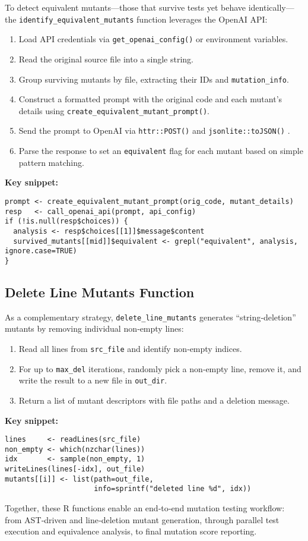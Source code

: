 To detect equivalent mutants—those that survive tests yet behave identically—the \texttt{identify\_equivalent\_mutants} function leverages the OpenAI API:

\begin{enumerate}
  \item Load API credentials via \texttt{get\_openai\_config()} or environment variables.  
  \item Read the original source file into a single string.  
  \item Group surviving mutants by file, extracting their IDs and \texttt{mutation\_info}.  
  \item Construct a formatted prompt with the original code and each mutant’s details using \texttt{create\_equivalent\_mutant\_prompt()}.  
  \item Send the prompt to OpenAI via \texttt{httr::POST()} and \texttt{jsonlite::toJSON()} \cite{wickham2011httr,ooms2014jsonlite,openai2023api}.  
  \item Parse the response to set an \texttt{equivalent} flag for each mutant based on simple pattern matching.
\end{enumerate}

\medskip
\noindent\textbf{Key snippet:}
\begin{verbatim}
prompt <- create_equivalent_mutant_prompt(orig_code, mutant_details)
resp   <- call_openai_api(prompt, api_config)
if (!is.null(resp$choices)) {
  analysis <- resp$choices[[1]]$message$content
  survived_mutants[[mid]]$equivalent <- grepl("equivalent", analysis, ignore.case=TRUE)
}
\end{verbatim}

\subsection{Delete Line Mutants Function}

As a complementary strategy, \texttt{delete\_line\_mutants} generates “string‐deletion” mutants by removing individual non‐empty lines:

\begin{enumerate}
  \item Read all lines from \texttt{src\_file} and identify non‐empty indices.  
  \item For up to \texttt{max\_del} iterations, randomly pick a non‐empty line, remove it, and write the result to a new file in \texttt{out\_dir}.  
  \item Return a list of mutant descriptors with file paths and a deletion message.
\end{enumerate}

\medskip
\noindent\textbf{Key snippet:}
\begin{verbatim}
lines     <- readLines(src_file)
non_empty <- which(nzchar(lines))
idx       <- sample(non_empty, 1)
writeLines(lines[-idx], out_file)
mutants[[i]] <- list(path=out_file,
                     info=sprintf("deleted line %d", idx))
\end{verbatim}

Together, these R functions enable an end‐to‐end mutation testing workflow: from AST‐driven and line‐deletion mutant generation, through parallel test execution and equivalence analysis, to final mutation score reporting.